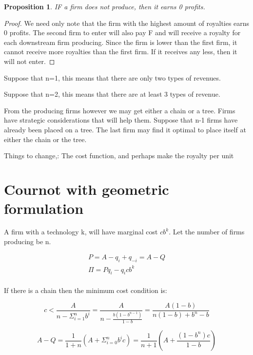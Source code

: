 \documentclass{article}
\newtheorem{proposition}{Proposition}
\begin{document}
\begin{proposition}
IF a firm does not produce, then it earns 0 profits. 
\end{proposition}

\begin{proof}
We need only note that the firm with the highest amount of royalties earns 0 profits. The second firm to enter will also pay F and will receive a royalty for each downstream firm producing. Since the firm is lower than the first firm, it cannot receive more royalties than the first firm. If it receives any less, then it will not enter. 
\end{proof}

Suppose that n=1, this means that there are only two types of revenues. 

Suppose that n=2, this means that there are at least 3 types of revenue. 

From the producing firms however we may get either a chain or a tree. Firms have strategic considerations that will help them. Suppose that n-1 firms have already been placed on a tree. The last firm may find it optimal to place itself at either the chain or the tree.  

Things to change,: The cost function, and perhaps make the royalty per unit

\section{Cournot with geometric formulation}

A firm with a technology k, will have marginal cost $c b^k$. Let the number of firms producing be n. 

\begin{align*}
P= A-q_i+q_{-i}=A-Q \\
\Pi = P q_i - q_i c b^k \\
\end{align*}

If there is a chain then the minimum cost condition is:

\begin{equation*}
c<
\frac{A}{n-\Sigma_{i=1}^n b^i}
=\frac{A}{n-\frac{b(1-b^{n-1})}{1-b}}
=\frac{A(1-b)}{n(1-b)+b^{n}-b}
\end{equation*}

\begin{equation*}
A-Q = \frac{1}{1+n} \left(
A+ \Sigma^n_{i=0} b^ic
\right) 
= \frac{1}{n+1} \left(
A+ \frac{(1-b^n)c}{1-b}
\right) 
\end{equation*}
\end{document}
